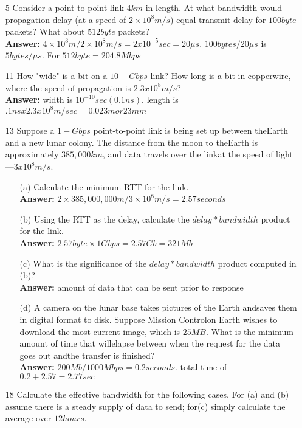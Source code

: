 \documentclass[a4paper]{article}
\begin{document}
\begin{itemize}
	\item[5] Consider a point-to-point link $4 km$ in length. At what bandwidth would propagation delay (at a speed of $2 \times 10^8m/s$) equal transmit delay for $100 byte$ packets? What about $512 byte$ packets? \\
	      \textbf{Answer:} $4 \times 10^3 m / 2 \times 10^8 m/s = 2x10^{-5} sec = 20 \mu  s$. $100 bytes / 20 \mu  s$ is $5 bytes/\mu s$. For $512 byte = 204.8 Mbps$ 
	\item[11] How "wide" is a bit on a $10-Gbps$ link? How long is a bit in copperwire, where the speed of propagation is $2.3x10^8m/s$? \\
	      \textbf{Answer:} width is $10^{-10} sec (0.1 ns)$. length is $.1 ns x 2.3 x 10^8 m/sec = 0.023 m or 23mm$ 
	\item[13] Suppose a $1-Gbps$ point-to-point link is being set up between theEarth and a new lunar colony. The distance from the moon to theEarth is approximately $385,000 km$, and data travels over the linkat the speed of light—$3x10^8m/s$.
	      \begin{itemize}
	      	\item[(a)] Calculate the minimum RTT for the link. \\
	      	      \textbf{Answer:} $2 \times 385, 000, 000 m / 3 \times 10^8 m/s = 2.57 seconds$ \\
	      	\item[(b)] Using the RTT as the delay, calculate the $delay * bandwidth$ product for the link. \\
	      	      \textbf{Answer:}  $2.57 byte \times 1 Gbps = 2.57 Gb = 321 Mb$ 
	      	\item[(c)] What is the significance of the $delay * bandwidth$ product computed in (b)? \\
	      	      \textbf{Answer:} amount of data that can be sent prior to response 
	      	\item[(d)] A camera on the lunar base takes pictures of the Earth andsaves them in digital format to disk. Suppose Mission Controlon Earth wishes to download the most current image, which is $25 MB$. What is the minimum amount of time that willelapse between when the request for the data goes out andthe transfer is finished? \\
	      	      \textbf{Answer:} $200 Mb / 1000 Mbps = 0.2 seconds$. total time of $0.2 + 2.57 = 2.77 sec$
	      \end{itemize} 
	\item[18] Calculate the effective bandwidth for the following cases. For (a) and (b) assume there is a steady supply of data to send; for(c) simply calculate the average over $12 hours$.

\end{itemize}
\end{document}
